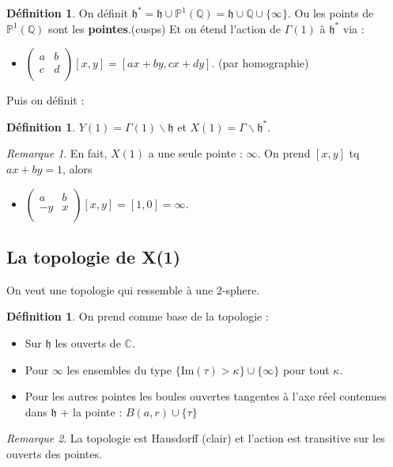 \documentclass[12pt]{article}
\theoremstyle{plain}
\theoremstyle{definition}
\newtheorem{defn}[subsubsection]{D\'efinition}
\theoremstyle{remark}
\newtheorem{rem}{Remarque}
\newcommand{\Q}{\mathbb{Q}}
\newcommand{\Proj}{\mathbb{P}}
\newcommand{\C}{\mathbb{C}}
\newcommand{\h}{\mathfrak{h}}
\begin{document}
\begin{defn}
    On définit $\h^*=\h\cup\Proj^1(\Q)=\h\cup\Q\cup\{\infty\}$. Ou les points de $\Proj^1(\Q)$ sont les \textbf{pointes}.(cusps)
    Et on étend l'action de $\Gamma(1)$ à $\h^*$ via :
    \begin{itemize}
        \item $\begin{pmatrix} a&b\\c&d\\ \end{pmatrix}[x,y]=[ax+by,cx+dy]$. (par homographie)
    \end{itemize}
\end{defn}

Puis on définit :
\begin{defn}
    $Y(1)=\Gamma(1)\backslash\h$ et $X(1)=\Gamma\backslash\h^*$. 
\end{defn}
\begin{rem}
    En fait, $X(1)$ a une seule pointe : $\infty$. On prend $[x,y]$ tq $ax+by=1$, 
    alors
    \begin{itemize}
        \item $\begin{pmatrix}a&b\\ -y & x\\ \end{pmatrix}[x,y]=[1,0]=\infty$.
    \end{itemize}
\end{rem}

\subsection{La topologie de X(1)}
On veut une topologie qui ressemble à une $2$-sphere.
\begin{defn}
    On prend comme base de la topologie :
    \begin{itemize}
        \item Sur $\h$ les ouverts de $\C$.
        \item Pour $\infty$ les ensembles du type $\{\text{Im}(\tau)>\kappa\}\cup\{\infty\}$ pour tout $\kappa$.
        \item Pour les autres pointes les boules ouvertes tangentes à l'axe réel contenues dans $\h$ + la pointe : $B(a, r)\cup \{\tau\}$
    \end{itemize}
\end{defn}

\begin{rem}
    La topologie est Hausdorff (clair) et l'action est transitive sur les ouverts des pointes.
\end{rem}
\end{document}
